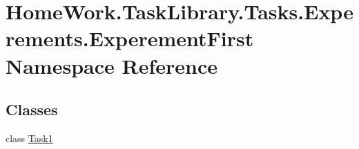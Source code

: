 \hypertarget{namespace_home_work_1_1_task_library_1_1_tasks_1_1_experements_1_1_experement_first}{}\section{Home\+Work.\+Task\+Library.\+Tasks.\+Experements.\+Experement\+First Namespace Reference}
\label{namespace_home_work_1_1_task_library_1_1_tasks_1_1_experements_1_1_experement_first}
\subsection*{Classes}
\begin{DoxyCompactItemize}
\item 
class \mbox{\hyperlink{class_home_work_1_1_task_library_1_1_tasks_1_1_experements_1_1_experement_first_1_1_task1}{Task1}}
\end{DoxyCompactItemize}
